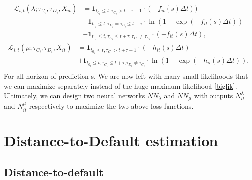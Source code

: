 \begin{align}
    \mathcal{L}_{i,t}(\lambda; \tau_{C_i},\tau_{D_i}, X_{it}) &= \textbf{1}_{t_{0_i} \leq t, \tau_{C_i} > t+\tau+1} \cdot (-f_{it}(s)\Delta t)) \\ \nonumber
    &+ \textbf{1}_{t_{0_i} \leq t, \tau_{D_i}=\tau_{C_i} \leq t+\tau}  \cdot \ln(1 - \exp(-f_{it}(s)\Delta t)) \\ \nonumber
    &+ \textbf{1}_{t_{0_i} \leq t, \tau_{C_i} \leq t+\tau, \tau_{D_i} \neq \tau_{C_i}} \cdot (-f_{it}(s)\Delta t),  \nonumber
\end{align}
\begin{align}
    \mathcal{L}_{i,t}(\mu; \tau_{C_i},\tau_{D_i}, X_{it}) &= \textbf{1}_{t_{0_i} \leq t, \tau_{C_i} > t+\tau+1} \cdot (- h_{it}(s)\Delta t) \\ \nonumber
    &+ \textbf{1}_{t_{0_i} \leq t, \tau_{C_i} \leq t+\tau, \tau_{D_i} \neq \tau_{C_i}} \cdot \ln(1-\exp(-h_{it}(s) \Delta t)). \\  \nonumber
\end{align}
For all horizon of prediction s. We are now left with many small likelihoods that we can maximize separately instead of the huge maximum likelihood \ref{biglik}. Ultimately, we can design two neural networks $NN_{\lambda}$ and $NN_{\mu}$ with outputs $N_{it}^{\lambda}$ and $N_{it}^{\mu}$ respectively to maximize the two above loss functions. 

\section{Distance-to-Default estimation}
\label{appendix2}


\subsection{Distance-to-default}

